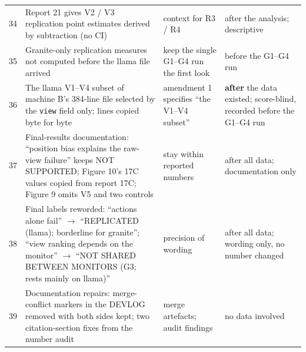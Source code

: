 \documentclass[conference]{IEEEtran}
\begin{document}
{\begin{supertabular}{@{}p{0.05\columnwidth}p{0.36\columnwidth}p{0.25\columnwidth}p{0.26\columnwidth}@{}}
34 & Report 21 gives V2 / V3 replication point estimates derived by subtraction (no CI) & context for R3 / R4 & after the analysis; descriptive\\
35 & Granite-only replication measures not computed before the llama file arrived & keep the single G1--G4 run the first look & before the G1--G4 run\\
36 & The llama V1--V4 subset of machine B's 384-line file selected by the \texttt{view} field only; lines copied byte for byte & amendment 1 specifies ``the V1--V4 subset'' & \textbf{after} the data existed; score-blind, recorded before the G1--G4 run\\
37 & Final-results documentation: ``position bias explains the raw-view failure'' keeps NOT SUPPORTED; Figure 10's 17C values copied from report 17C; Figure 9 omits V5 and two controls & stay within reported numbers & after all data; documentation only\\
38 & Final labels reworded: ``actions alone fail'' $\rightarrow$ ``REPLICATED (llama); borderline for granite''; ``view ranking depends on the monitor'' $\rightarrow$ ``NOT SHARED BETWEEN MONITORS (G3; rests mainly on llama)'' & precision of wording & after all data; wording only, no number changed\\
39 & Documentation repairs: merge-conflict markers in the DEVLOG removed with both sides kept; two citation-section fixes from the number audit & merge artefacts; audit findings & no data involved\\
\end{supertabular}
}
\end{document}

